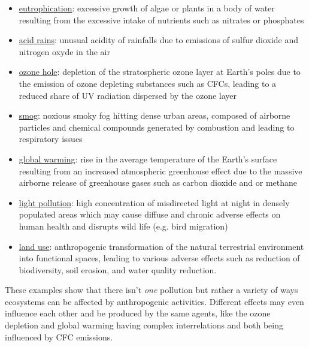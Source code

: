 \documentclass{article}
\begin{document}
\begin{itemize} %
	\item \href{https://en.wikipedia.org/wiki/Eutrophication}{eutrophication}: excessive growth of algae or plants in a body of water resulting from the excessive intake of nutrients such as nitrates or phosphates
	\item \href{https://en.wikipedia.org/wiki/Acid_rain}{acid rains}: unusual acidity of rainfalls due to emissions of sulfur dioxide and nitrogen oxyde in the air
	\item \href{https://en.wikipedia.org/wiki/Ozone_depletion}{ozone hole}: depletion of the stratospheric ozone layer at Earth's poles due to the emission of ozone depleting substances such as CFCs, leading to a reduced share of UV radiation dispersed by the ozone layer
	\item \href{https://en.wikipedia.org/wiki/Smog}{smog}: noxious smoky fog hitting dense urban areas, composed of airborne particles and chemical compounds generated by combustion and leading to respiratory issues
	\item \href{https://en.wikipedia.org/wiki/Global_warming}{global warming}: rise in the average temperature of the Earth's surface resulting from an increased atmospheric greenhouse effect due to the massive airborne release of greenhouse gases such as carbon dioxide and or methane
	\item \href{https://en.wikipedia.org/wiki/Light_pollution}{light pollution}: high concentration of misdirected light at night in densely populated areas which may cause diffuse and chronic adverse effects on human health and disrupts wild life (e.g. bird migration) 
	\item \href{https://en.wikipedia.org/wiki/Land_use}{land use}: anthropogenic transformation of the natural terrestrial environment into functional spaces, leading to various adverse effects such as reduction of biodiversity, soil erosion, and water quality reduction. 
\end{itemize}
These examples show that there isn't \emph{one} pollution but rather a variety of ways ecosystems can be affected by anthropogenic activities. Different effects may even influence each other and be produced by the same agents, like the ozone depletion and global warming having complex interrelations and both being influenced by CFC emissions.
\end{document}
